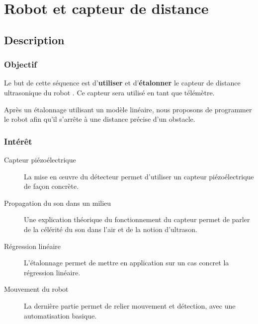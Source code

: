 \section{Robot \mq et capteur de distance}

\subsection{Description}

\subsubsection{Objectif}

\begin{formule}
Le but de cette séquence est d’\textbf{utiliser} et d'\textbf{étalonner} le capteur de distance ultrasonique du robot \mq. Ce capteur sera utilisé en tant que télémètre.

Après un étalonnage utilisant un modèle linéaire, nous proposons de programmer le robot afin qu'il  s’arrête à une distance précise d’un obstacle.
\end{formule}


\subsubsection{Intérêt}


\begin{description}
    \item [Capteur piézoélectrique] La mise en œuvre du détecteur permet d’utiliser un capteur piézoélectrique de façon concrète.
    \item [Propagation du son dans un milieu] Une explication théorique du fonctionnement du capteur permet de parler de la célérité du son dans l’air et de la notion d’ultrason.
    \item [Régression linéaire] L’étalonnage permet de mettre en application sur un cas concret la régression linéaire.
    \item [Mouvement du robot] La dernière partie permet de relier mouvement et détection, avec une automatisation basique. 
\end{description}


